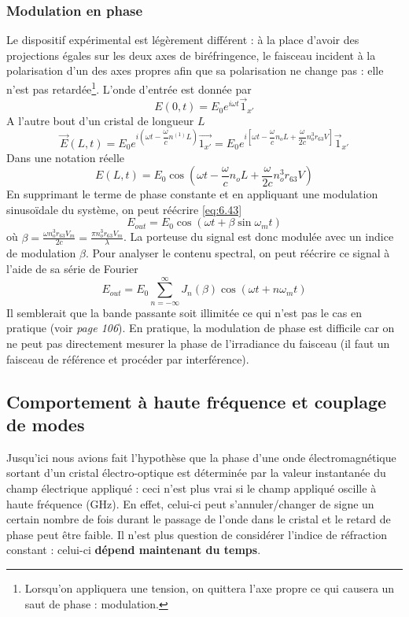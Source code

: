 \subsubsection{Modulation en phase}
Le dispositif expérimental est légèrement différent : à la place d'avoir des projections égales sur les
deux axes de biréfringence, le faisceau incident à la polarisation d'un des axes propres afin que sa 
polarisation ne change pas : elle n'est pas retardée\footnote{Lorsqu'on appliquera une tension, on quittera
l'axe propre ce qui causera un saut de phase : modulation.}. L'onde d'entrée est donnée par
\begin{equation}
E(0,t) = E_0e^{i\omega t}\vec{1}_{x'}
\end{equation}
A l'autre bout d'un cristal de longueur $L$
\begin{equation}
\vec E(L,t) = E_0e^ {i\left(\omega t-\dfrac{\omega}{c}n^ {(1)}L\right)}\vec{1_{x'}} = E_0e^{i\left[\omega t-\dfrac{\omega}{c}n_oL+\dfrac{\omega}{2c}n_o^3r_{63}V\right]}\vec{1}_{x'}
\end{equation}
Dans une notation réelle
\begin{equation}
E(L,t) = E_0\cos\left(\omega t-\dfrac{\omega}{c}n_oL+\dfrac{\omega}{2c}n_o^3r_{63}V\right)
\label{eq:6.43}
\end{equation}
En supprimant le terme de phase constante et en appliquant une modulation sinusoïdale du système, on peut
réécrire \eqref{eq:6.43}
\begin{equation}
E_{out} = E_0\cos(\omega t + \beta \sin \omega_mt)
\end{equation}
où $\beta = \frac{\omega n_o^3r_{63}V_m}{2c} = \frac{\pi n_o^ 3r_{63}V_m}{\lambda}$. La porteuse du signal est
donc modulée avec un indice de modulation $\beta$. Pour analyser le contenu spectral, on peut réécrire ce 
signal à l'aide de sa série de Fourier
\begin{equation}
E_{out} = E_0\sum_{n=-\infty}^\infty J_n(\beta)\cos(\omega t + n\omega_mt)
\end{equation}
Il semblerait que la bande passante soit illimitée ce qui n'est pas le cas en pratique (voir \textit{page 106}).
En pratique, la modulation de phase est difficile car on ne peut pas directement mesurer la phase de l'irradiance
du faisceau (il faut un faisceau de référence et procéder par interférence).


\subsection{Comportement à haute fréquence et couplage de modes}
Jusqu'ici nous avions fait l'hypothèse que la phase d'une onde électromagnétique sortant d'un cristal 
électro-optique est déterminée par la valeur instantanée du champ électrique appliqué : ceci n'est plus
vrai si le champ appliqué oscille à haute fréquence (GHz). En effet, celui-ci peut s'annuler/changer
de signe un certain nombre de fois durant le passage de l'onde dans le cristal et le retard de phase 
peut être faible. Il n'est plus question de considérer l'indice de réfraction constant : celui-ci
\textbf{dépend maintenant du temps}.\\


